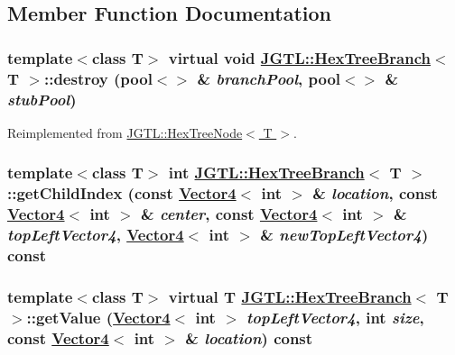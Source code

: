 \subsection{Member Function Documentation}
\hypertarget{class_j_g_t_l_1_1_hex_tree_branch_d89e805f2da424578087d92b0be7e35e}{
\subsubsection[destroy]{\setlength{\rightskip}{0pt plus 5cm}template$<$class T$>$ virtual void \hyperlink{class_j_g_t_l_1_1_hex_tree_branch}{JGTL::Hex\-Tree\-Branch}$<$ T $>$::destroy (pool$<$$>$ \& {\em branch\-Pool}, pool$<$$>$ \& {\em stub\-Pool})}}
\label{class_j_g_t_l_1_1_hex_tree_branch_d89e805f2da424578087d92b0be7e35e}




Reimplemented from \hyperlink{class_j_g_t_l_1_1_hex_tree_node_f093e463c1b3247b587370802caa98f2}{JGTL::Hex\-Tree\-Node$<$ T $>$}.\hypertarget{class_j_g_t_l_1_1_hex_tree_branch_675bb8015ef743e126b2b5a8986195e5}{
\subsubsection[getChildIndex]{\setlength{\rightskip}{0pt plus 5cm}template$<$class T$>$ int \hyperlink{class_j_g_t_l_1_1_hex_tree_branch}{JGTL::Hex\-Tree\-Branch}$<$ T $>$::get\-Child\-Index (const \hyperlink{class_j_g_t_l_1_1_vector4}{Vector4}$<$ int $>$ \& {\em location}, const \hyperlink{class_j_g_t_l_1_1_vector4}{Vector4}$<$ int $>$ \& {\em center}, const \hyperlink{class_j_g_t_l_1_1_vector4}{Vector4}$<$ int $>$ \& {\em top\-Left\-Vector4}, \hyperlink{class_j_g_t_l_1_1_vector4}{Vector4}$<$ int $>$ \& {\em new\-Top\-Left\-Vector4}) const}}
\label{class_j_g_t_l_1_1_hex_tree_branch_675bb8015ef743e126b2b5a8986195e5}


\hypertarget{class_j_g_t_l_1_1_hex_tree_branch_e5124a6441d3e3d3c21f0d20124a3599}{
\subsubsection[getValue]{\setlength{\rightskip}{0pt plus 5cm}template$<$class T$>$ virtual T \hyperlink{class_j_g_t_l_1_1_hex_tree_branch}{JGTL::Hex\-Tree\-Branch}$<$ T $>$::get\-Value (\hyperlink{class_j_g_t_l_1_1_vector4}{Vector4}$<$ int $>$ {\em top\-Left\-Vector4}, int {\em size}, const \hyperlink{class_j_g_t_l_1_1_vector4}{Vector4}$<$ int $>$ \& {\em location}) const}}
\label{class_j_g_t_l_1_1_hex_tree_branch_e5124a6441d3e3d3c21f0d20124a3599}




